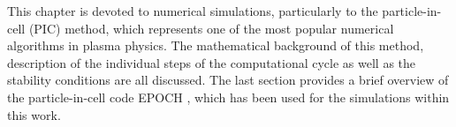 This chapter is devoted to numerical simulations, particularly to the particle-in-cell (PIC) method, which represents one of the most popular numerical algorithms in plasma physics. The mathematical background of this method, description of the individual steps of the computational cycle as well as the stability conditions are all discussed. The last section provides a brief overview of the particle-in-cell code EPOCH \cite{bennett}, which has been used for the simulations within this work.